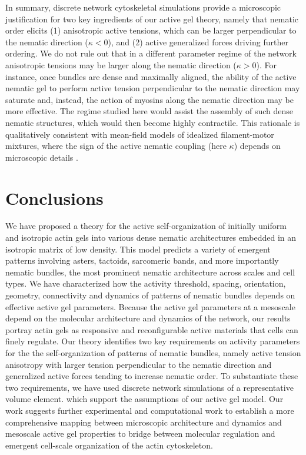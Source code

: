 In summary, discrete network cytoskeletal simulations provide a microscopic justification for two key ingredients of our active gel theory, namely that nematic order elicits (1) anisotropic active tensions, which can be larger perpendicular to the nematic direction ($\kappa<0$), and (2) active generalized forces driving further ordering. We do not rule out that in a different parameter regime of the network anisotropic tensions may be larger along the nematic direction ($\kappa>0$). For instance, once bundles are dense and maximally aligned, the ability of the  active nematic gel to perform active tension perpendicular to the nematic direction may saturate and, instead, the action of myosins along the nematic direction may be more effective. The regime studied here would assist the assembly of such dense nematic structures, which  would then become highly contractile. This rationale is qualitatively consistent with mean-field models of idealized filament-motor mixtures, where the sign of the active nematic coupling (here $\kappa$) depends on microscopic details \cite{C9SM00558G}. 


\section{Conclusions}

We have proposed a theory for the active self-organization of initially uniform and isotropic actin gels into various dense nematic architectures embedded in an isotropic matrix of low density. This model predicts a variety of emergent patterns involving asters, tactoids, sarcomeric bands, and more importantly nematic bundles, the most prominent nematic architecture across scales and cell types. We have characterized how the activity threshold, spacing, orientation, geometry, connectivity and dynamics of patterns of nematic bundles depends on effective active gel parameters. Because the active gel parameters at a mesoscale depend on the molecular architecture and dynamics of the network, our results portray actin gels as responsive and reconfigurable active materials that cells can finely regulate. Our theory identifies two key requirements on activity parameters for the the self-organization of patterns of nematic bundles, namely active tension anisotropy with larger tension perpendicular to the nematic direction and generalized active forces tending to increase nematic order. To substantiate these two requirements, we have used discrete network simulations of a representative volume element. which support the assumptions of our active gel model. 
Our work suggests further experimental and computational work to establish a more comprehensive mapping between microscopic architecture and dynamics and mesoscale active gel properties to bridge between molecular regulation and emergent cell-scale organization of the actin cytoskeleton.
	
